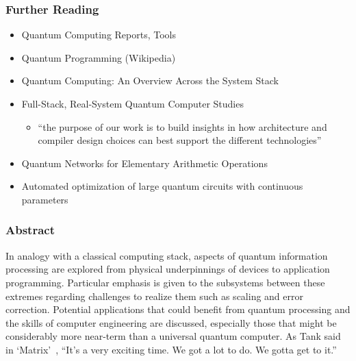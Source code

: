 \documentclass[handout]{beamer}
\begin{document}
\begin{frame}
  \frametitle{Further Reading}
  \begin{itemize}
  \item Quantum Computing Reports, Tools~\cite{qcomprpt-tools}
  \item Quantum Programming (Wikipedia)~\cite{wikipedia-qcomp}
  \item Quantum Computing: An Overview Across the System Stack~\cite{arxiv:1905.07240}
  \item Full-Stack, Real-System Quantum Computer Studies~\cite{arxiv:1905:11349} 
    \begin{itemize}
    \item ``the purpose of our work is to build insights in how architecture and compiler design choices can best support the different technologies''
    \end{itemize}
  \item Quantum Networks for Elementary Arithmetic Operations~\cite{arXiv:9511018}
  \item Automated optimization of large quantum circuits with continuous parameters~\cite{npj-s41534-018-0072-4}
  \end{itemize}
\end{frame}


\begin{frame}
  \frametitle{Abstract}
  In analogy with a classical computing stack, aspects of quantum information processing are explored from physical underpinnings of devices to application programming. Particular emphasis is given to the subsystems between these extremes regarding challenges to realize them such as scaling and error correction. Potential applications that could benefit from quantum processing and the skills of computer engineering are discussed, especially those that might be considerably more near-term than a universal quantum computer. As Tank said in `Matrix'~\cite{movie-Matrix}, ``It’s a very exciting time. We got a lot to do. We gotta get to it.''
\end{frame}
\end{document}

